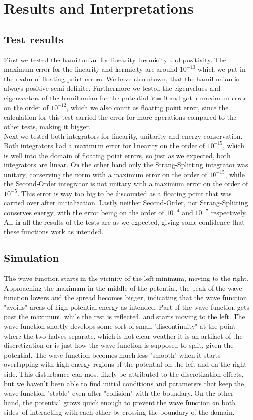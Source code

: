 \documentclass[11pt, letterpaper, onecolumn]{article}
\begin{document}
    
\section{Results and Interpretations}

\subsection{Test results}
First we tested the hamiltonian for linearity, hermicity and positivity. The maximum error for the linearity and hermicity are around $10^{-13}$ which we put in the realm of floating point errors. We have also shown, that the hamiltonian is always positive semi-definite. Furthermore we tested the eigenvalues and eigenvectors of the hamiltonian for the potential $V=0$ and got a maximum error on the order of $10^{-12}$, which we also count as floating point error, since the calculation for this test carried the error for more operations compared to the other tests, making it bigger.\\
Next we tested both integrators for linearity, unitarity and energy conservation. Both integrators had a maximum error for linearity on the order of $10^{-15}$, which is well into the domain of floating point errors, so just as we expected, both integrators are linear. On the other hand only the Strang-Splitting integrator was unitary, conserving the norm with a maximum error on the order of $10^{-15}$, while the Second-Order integrator is not unitary with a maximum error on the order of $10^{-5}$. This error is way too big to be discounted as a floating point that was carried over after initialization. Lastly neither Second-Order, nor Strang-Splitting conserves energy, with the error being on the order of $10^{-4}$ and $10^{-7}$ respectively.\\
All in all the results of the tests are as we expected, giving some confidence that these functions work as intended.
\subsection{Simulation}
The wave function starts in the vicinity of the left minimum, moving to the right. Approaching the maximum in the middle of the potential, the peak of the wave function lowers and the spread becomes bigger, indicating that the wave function "avoids" areas of high potential energy as intended. Part of the wave function gets past the maximum, while the rest is reflected, and starts moving to the left. The wave function shortly develops some sort of small "discontinuity" at the point where the two halves separate, which is not clear weather it is an artifact of the discretization or is just how the wave function is supposed to split, given the potential. The wave function becomes much less "smooth" when it starts overlapping with high energy regions of the potential on the left and on the right side. This disturbance can most likely be attributed to the discretization effects, but we haven't been able to find initial conditions and parameters that keep the wave function "stable" even after "collision" with the boundary. On the other hand, the potential grows quick enough to prevent the wave function on both sides, of interacting with each other by crossing the boundary of the domain.
\end{document}

